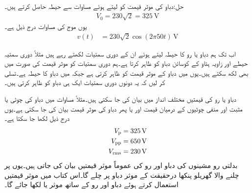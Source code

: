 حل:دباو کی موثر قیمت کو  لیتے ہوئے  مساوات  سے  حیطہ حاصل کرتے ہیں۔
\begin{align}
V_0=230 \sqrt{2}=\SI{325}{\volt}
\end{align}
یوں موج کی مساوات درج ذیل ہے۔
\begin{align}\label{مساوات_طاقت_پاکستانی_گھریلو_دباو}
v(t)&=230 \sqrt{2}\cos (2\pi 50 t)\, \si{\volt}
\end{align}

اب تک ہم دباو یا رو کا حیطہ لیتے ہوئے ان کے دوری سمتیات لکھتے رہے ہیں مثلاً   دوری سمتیہ  حیطے اور  زاویہ ہٹاو کے کوسائن دباو کو ظاہر کرتا ہے۔ہم دوری سمتیات کو موثر قیمت کی صورت میں بھی لکھ سکتے ہیں۔یوں
  میں  دباو کے موثر قیمت کو ظاہر کرتی ہے  جبکہ
  میں  دباو کا حیطہ ہے۔تسلی کر لیں کہ یہ دونوں دوری سمتیات ایک ہی دباو کو ظاہر کرتی ہیں۔

دباو یا رو کی قیمتیں مختلف انداز میں بیان کی جا سکتی  ہیں۔مثلاً مساوات  میں دباو کی چوٹی  یا مثبت اور منفی چوٹیوں کے درمیان قیمت  اور یا پھر دباو کی موثر قیمت  بیان کی جا سکتی ہے۔یوں درج ذیل لکھا جا سکتا ہے۔
\begin{align*}
V_{\textup{p}}&=\SI{325}{\volt}\\
V_{\textup{pp}}&=\SI{650}{\volt}\\
{V_{\textup{rms}}}&=\SI{230}{\volt}
\end{align*}
بدلتی رو مشینوں کی دباو اور رو کی عموماً موثر قیمتیں بیان کی جاتی ہیں۔یوں  پر چلنے والا گھریلو پنکھا درحقیقت  کے موثر دباو پر چلے گا۔اس کتاب میں موثر قیمتیں استعمال کرتے ہوئے دباو اور رو کے ساتھ موثر یا  لکھا جائے گا۔

